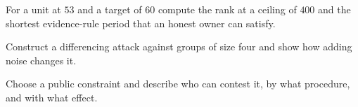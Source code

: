 \begin{exercise}
For a unit at $53$ and a target of $60$ compute the rank at a ceiling of $400$ and the shortest evidence-rule period that an honest owner can satisfy.
\end{exercise}
\begin{exercise}
Construct a differencing attack against groups of size four and show how adding noise changes it.
\end{exercise}
\begin{exercise}
Choose a public constraint and describe who can contest it, by what procedure, and with what effect.
\end{exercise}
